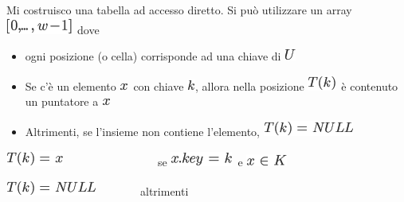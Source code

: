 \documentclass{article}
\providecommand{\tightlist}{%
  \setlength{\itemsep}{0pt}\setlength{\parskip}{0pt}}
\begin{document}
{}

{Mi costruisco una tabella ad accesso diretto. Si può utilizzare un
array }\includegraphics{images/image225.png}{~dove}

\begin{itemize}
\tightlist
\item
  {ogni posizione (o cella) corrisponde ad una chiave di
  }\includegraphics{images/image222.png}
\item
  {Se c'è un elemento }\includegraphics{images/image82.png}{~con chiave
  }\includegraphics{images/image118.png}{, allora nella posizione
  }\includegraphics{images/image226.png}{~è contenuto un puntatore a
  }\includegraphics{images/image82.png}
\item
  {Altrimenti, se l'insieme non contiene l'elemento,
  }\includegraphics{images/image227.png}
\end{itemize}

{}

\includegraphics{images/image228.png}{~~~~~~~~~~~~~~~~~se
}\includegraphics{images/image229.png}{~e
}\includegraphics{images/image230.png}

\includegraphics{images/image227.png}{~~~~~~~~altrimenti}
\end{document}
